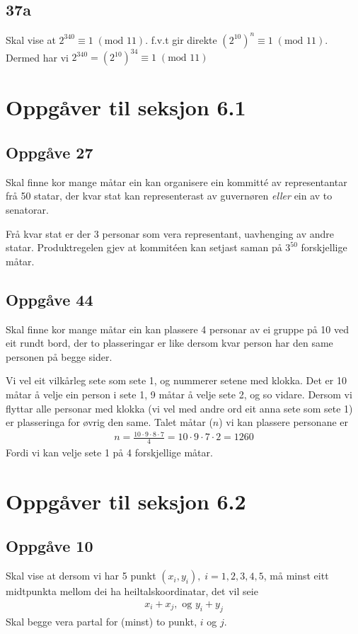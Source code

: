 \documentclass[a4paper, 11pt]{article}
\newcommand{\Modulo}{\text{mod }}
\begin{document}
\subsection*{37a}
Skal vise at \(2^{340} \equiv 1 \;(\Modulo 11)\).
f.v.t gir direkte \((2^{10})^n \equiv 1 \;(\Modulo 11)\).
Dermed har vi \(2^{340} = (2^{10})^{34} \equiv 1 \;(\Modulo 11)\)


\newpage
\section*{Oppgåver til seksjon 6.1} %
\subsection*{Oppgåve 27}
Skal finne kor mange måtar ein kan organisere ein kommitté av representantar frå 50 statar,
der kvar stat kan representerast av guvernøren {\em eller} ein av to senatorar.

Frå kvar stat er der 3 personar som vera representant, uavhenging av andre statar.
Produktregelen gjev at kommitéen kan setjast saman på \(3^{50}\) forskjellige måtar.


\subsection*{Oppgåve 44}
Skal finne kor mange måtar ein kan plassere 4 personar av ei gruppe på 10 ved eit rundt bord,
der to plasseringar er like dersom kvar person har den same personen på begge sider.

Vi vel eit vilkårleg sete som sete 1, og nummerer setene med klokka.
Det er 10 måtar å velje ein person i sete 1, 9 måtar å velje sete 2, og so vidare.
Dersom vi flyttar alle personar med klokka (vi vel med andre ord eit anna sete som sete 1)
er plasseringa for øvrig den same. Talet måtar (\(n\)) vi kan plassere personane er
\begin{align*}
    n = \frac{10 \cdot 9 \cdot 8 \cdot 7}{4} = 10 \cdot 9 \cdot 7 \cdot 2 = 1260
\end{align*}
Fordi vi kan velje sete 1 på 4 forskjellige måtar.


\section*{Oppgåver til seksjon 6.2} %
\subsection*{Oppgåve 10}
Skal vise at dersom vi har 5 punkt \((x_i, y_i), \; i = 1,2,3,4,5\), må minst eitt midtpunkta mellom
dei ha heiltalskoordinatar, det vil seie
\begin{align*}
    x_i+x_j, \text{ og } y_i+y_j
\end{align*}
Skal begge vera partal for (minst) to punkt, \(i\) og \(j\).
\end{document}
